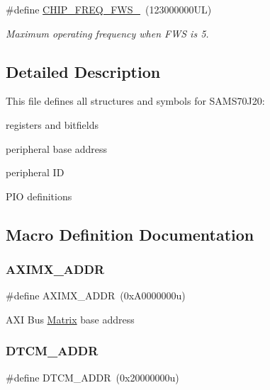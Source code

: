 \begin{DoxyCompactItemize}
\mbox{\label{group__SAMS70J20__definitions_ga3b66824f858591135877b369f98d48a5}} 
\#define \mbox{\hyperlink{group__SAMS70J20__definitions_ga3b66824f858591135877b369f98d48a5}{C\+H\+I\+P\+\_\+\+F\+R\+E\+Q\+\_\+\+F\+W\+S\+\_}}~(123000000\+U\+L)
\begin{DoxyCompactList}\small\item\em Maximum operating frequency when F\+WS is 5. \end{DoxyCompactList}\end{DoxyCompactItemize}


\subsection{Detailed Description}
This file defines all structures and symbols for S\+A\+M\+S70\+J20\+:
\begin{DoxyItemize}
\item registers and bitfields
\item peripheral base address
\item peripheral ID
\item P\+IO definitions 
\end{DoxyItemize}

\subsection{Macro Definition Documentation}
\mbox{\label{group__SAMS70J20__definitions_ga2fb7cc681bf5e7fbce5e3635b72a330a}} 
\subsubsection{\texorpdfstring{AXIMX\_ADDR}{AXIMX\_ADDR}}
{\footnotesize\ttfamily \#define A\+X\+I\+M\+X\+\_\+\+A\+D\+DR~(0x\+A0000000u)}

A\+XI Bus \mbox{\hyperlink{structMatrix}{Matrix}} base address \mbox{\label{group__SAMS70J20__definitions_ga26626a425f7ebb3a0c2dbc276f0d9f78}} 
\subsubsection{\texorpdfstring{DTCM\_ADDR}{DTCM\_ADDR}}
{\footnotesize\ttfamily \#define D\+T\+C\+M\+\_\+\+A\+D\+DR~(0x20000000u)}

